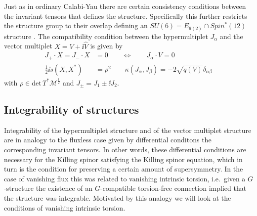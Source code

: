 Just as in ordinary Calabi-Yau there are certain consistency conditions between the invariant tensors that defines the structure. Specifically this further restricts the structure group to their overlap defining an $SU(6)=E_{6(2)}\cap Spin^*(12)$ structure \cite{Grana:2009im}. The compatibility condition between the hypermultiplet $J_\alpha$ and the vector multiplet $X=V+\ii \hat{V}$ is given by 
\begin{equation}\label{eq:CompatibilityVectorHyperStructure}
    \begin{aligned}
        J_+ \cdot X = J_-\cdot X &= 0\qquad\Longleftrightarrow\qquad J_\alpha\cdot V = 0\\
        \frac{1}{2}\ii s(X,X^*) &= \rho^2\qquad \kappa(J_\alpha,J_\beta) = -2\sqrt{q(V)}\delta_{\alpha\beta}
    \end{aligned}
\end{equation}
with $\rho\in\text{det}\, T^*\mathcal{M}^\frac{1}{2}$ and $J_\pm = J_1\pm \ii J_2$. 




\subsection{Integrability of structures}

Integrability of the hypermultiplet structure and of the vector multiplet structure are in analogy to the fluxless case given by differential conditons the corresponding invariant tensors. In other words, these differential conditions are necessary for the Killing spinor satisfying the Killing spinor equation, which in turn is the condition for preserving a certain amount of supersymmetry. In the case of vanishing flux this was related to vanishing intrinsic torsion, i.e.\ given a $G$-structure the existence of an $G$-compatible torsion-free connection implied that the structure was integrable. Motivated by this analogy we will look at the conditions of vanishing intrinsic torsion.


